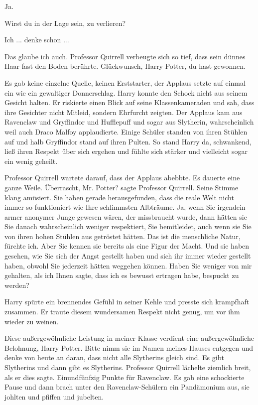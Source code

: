 \glqq{}Ja.\grqq{}

\glqq{}Wirst du in der Lage sein, zu verlieren?\grqq{}

\glqq{}Ich ... denke schon ...\grqq{}

\glqq{}Das glaube ich auch.\grqq{} Professor Quirrell verbeugte sich so tief,
dass sein dünnes Haar fast den Boden berührte. \glqq{}Glückwunsch, Harry Potter,
du hast gewonnen.\grqq{}

Es gab keine einzelne Quelle, keinen Erststarter, der Applaus setzte auf einmal
ein wie ein gewaltiger Donnerschlag. Harry konnte den Schock nicht aus seinem
Gesicht halten. Er riskierte einen Blick auf seine Klassenkameraden und sah,
dass ihre Gesichter nicht Mitleid, sondern Ehrfurcht zeigten. Der Applaus kam
aus Ravenclaw und Gryffindor und Hufflepuff und sogar aus Slytherin,
wahrscheinlich weil auch Draco Malfoy applaudierte. Einige Schüler standen von
ihren Stühlen auf und halb Gryffindor stand auf ihren Pulten. So stand Harry da,
schwankend, ließ ihren Respekt über sich ergehen und fühlte sich stärker und
vielleicht sogar ein wenig geheilt.

Professor Quirrell wartete darauf, dass der Applaus abebbte. Es dauerte eine
ganze Weile. \glqq{}Überrascht, Mr. Potter?\grqq{} sagte Professor Quirrell.
Seine Stimme klang amüsiert. \glqq{}Sie haben gerade herausgefunden, dass die
reale Welt nicht immer so funktioniert wie Ihre schlimmsten Albträume. Ja, wenn
Sie irgendein armer anonymer Junge gewesen wären, der missbraucht wurde, dann
hätten sie Sie danach wahrscheinlich weniger respektiert, Sie bemitleidet, auch
wenn sie Sie von ihren hohen Stühlen aus getröstet hätten. Das ist die
menschliche Natur, fürchte ich. Aber Sie kennen sie bereits als eine Figur der
Macht. Und sie haben gesehen, wie Sie sich der Angst gestellt haben und sich ihr
immer wieder gestellt haben, obwohl Sie jederzeit hätten weggehen können. Haben
Sie weniger von mir gehalten, als ich Ihnen sagte, dass ich es bewusst ertragen
habe, bespuckt zu werden?\grqq{}

Harry spürte ein brennendes Gefühl in seiner Kehle und presste sich krampfhaft
zusammen. Er traute diesem wundersamen Respekt nicht genug, um vor ihm wieder zu
weinen.

\glqq{}Diese außergewöhnliche Leistung in meiner Klasse verdient eine
außergewöhnliche Belohnung, Harry Potter. Bitte nimm sie im Namen meines Hauses
entgegen und denke von heute an daran, dass nicht alle Slytherins gleich sind.
Es gibt Slytherins und dann gibt es Slytherins.\grqq{} Professor Quirrell
lächelte ziemlich breit, als er dies sagte. \glqq{}Einundfünfzig Punkte für
Ravenclaw.\grqq{} Es gab eine schockierte Pause und dann brach unter den
Ravenclaw-Schülern ein Pandämonium aus, sie johlten und pfiffen und jubelten.


